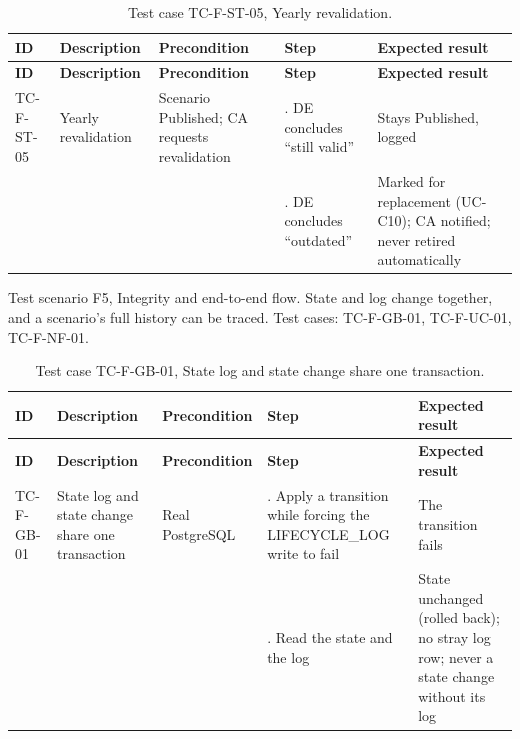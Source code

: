 {\small
\begin{longtable}{|>{\raggedright\arraybackslash}p{}|>{\raggedright\arraybackslash}p{}|>{\raggedright\arraybackslash}p{}|>{\raggedright\arraybackslash}p{}|>{\raggedright\arraybackslash}p{}|}
\caption{Test case TC-F-ST-05, Yearly revalidation.} \\
\hline
\textbf{ID} & \textbf{Description} & \textbf{Precondition} & \textbf{Step} & \textbf{Expected result} \\ \hline
\endfirsthead
\hline
\textbf{ID} & \textbf{Description} & \textbf{Precondition} & \textbf{Step} & \textbf{Expected result} \\ \hline
\endhead
TC-F-ST-05 & Yearly revalidation & Scenario Published; CA requests revalidation & 1. DE concludes ``still valid'' & Stays Published, logged \\ \hline
 &  &  & 2. DE concludes ``outdated'' & Marked for replacement (UC-C10); CA notified; never retired automatically \\ \hline
\end{longtable}
}

Test scenario F5, Integrity and end-to-end flow. State and log change together, and a scenario's full history can be traced. Test cases: TC-F-GB-01, TC-F-UC-01, TC-F-NF-01.

{\small
\begin{longtable}{|>{\raggedright\arraybackslash}p{}|>{\raggedright\arraybackslash}p{}|>{\raggedright\arraybackslash}p{}|>{\raggedright\arraybackslash}p{}|>{\raggedright\arraybackslash}p{}|}
\caption{Test case TC-F-GB-01, State log and state change share one transaction.} \\
\hline
\textbf{ID} & \textbf{Description} & \textbf{Precondition} & \textbf{Step} & \textbf{Expected result} \\ \hline
\endfirsthead
\hline
\textbf{ID} & \textbf{Description} & \textbf{Precondition} & \textbf{Step} & \textbf{Expected result} \\ \hline
\endhead
TC-F-GB-01 & State log and state change share one transaction & Real PostgreSQL & 1. Apply a transition while forcing the LIFECYCLE\_LOG write to fail & The transition fails \\ \hline
 &  &  & 2. Read the state and the log & State unchanged (rolled back); no stray log row; never a state change without its log \\ \hline
\end{longtable}
}

